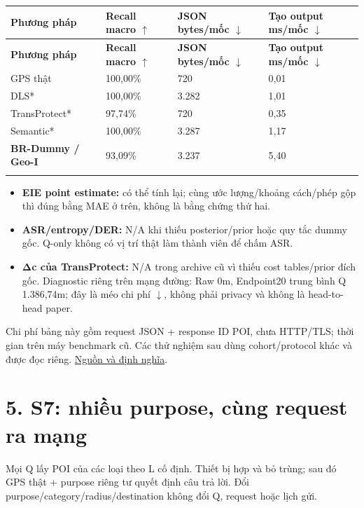\documentclass[11pt,a4paper]{article}
\begin{document}
\begingroup\small
\begin{longtable}{@{}P{4.959cm}P{3.306cm}P{4.132cm}P{4.132cm}@{}}
\toprule
\textbf{Phương pháp} & \textbf{Recall macro $\uparrow$} & \textbf{JSON bytes/mốc $\downarrow$} & \textbf{Tạo output ms/mốc $\downarrow$}\\\midrule
\endfirsthead
\toprule
\textbf{Phương pháp} & \textbf{Recall macro $\uparrow$} & \textbf{JSON bytes/mốc $\downarrow$} & \textbf{Tạo output ms/mốc $\downarrow$}\\\midrule
\endhead\bottomrule\endfoot
GPS thật & 100,00\% & 720 & 0,01\\
\addlinespace[2pt]
DLS* & 100,00\% & 3.282 & 1,01\\
\addlinespace[2pt]
TransProtect* & 97,74\% & 720 & 0,35\\
\addlinespace[2pt]
Semantic* & 100,00\% & 3.287 & 1,17\\
\addlinespace[2pt]
\textbf{BR-Dummy / Geo-I} & 93,09\% & 3.237 & 5,40\\
\addlinespace[2pt]
\end{longtable}
\endgroup
\begin{itemize}
\item \textbf{EIE point estimate:} có thể tính lại; cùng ước lượng/khoảng cách/phép gộp thì đúng bằng MAE ở trên, không là bằng chứng thứ hai.
\item \textbf{ASR/entropy/DER:} N/A khi thiếu posterior/prior hoặc quy tắc dummy gốc. Q-only không có vị trí thật làm thành viên để chấm ASR.
\item \textbf{Δc của TransProtect:} N/A trong archive cũ vì thiếu cost tables/prior đích gốc. Diagnostic riêng trên mạng đường: Raw 0m, Endpoint20 trung bình Q 1.386,74m; đây là méo chi phí $\downarrow$, không phải privacy và không là head-to-head paper.
\end{itemize}
Chi phí bảng này gồm request JSON + response ID POI, chưa HTTP/TLS; thời gian trên máy benchmark cũ. Các thử nghiệm sau dùng cohort/protocol khác và được đọc riêng. \href{evidence.json}{Nguồn và định nghĩa}.

\clearpage
\section*{5. S7: nhiều purpose, cùng request ra mạng}
Mọi Q lấy POI của các loại theo L cố định. Thiết bị hợp và bỏ trùng; sau đó GPS thật + purpose riêng tư quyết định câu trả lời. Đổi purpose/category/radius/destination không đổi Q, request hoặc lịch gửi.
\end{document}
